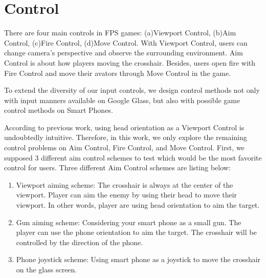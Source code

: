 \documentclass{acm_proc_article-sp}
\begin{document}
\section{Control}
There are four main controls in FPS games: (a)Viewport Control, (b)Aim Control, (c)Fire Control, (d)Move Control.
With Viewport Control, users can change camera's perspective and observe the surrounding environment.
Aim Control is about how players moving the crosshair.
Besides, users open fire with Fire Control and move their avators through Move Control in the game.

To extend the diversity of our input controls, we design control methods not only with input manners available on Google Glass, but also with possible game control methods on Smart Phones.

According to previous work\cite{headvideo,tele,robot,viewport}, using head orientation as a Viewport Control is undoubtedly intuitive.%
Therefore, in this work, we only explore the remaining control problems on Aim Control, Fire Control, and Move Control. 
First, we supposed 3 different aim control schemes to test which would be the most favorite control for users. 
Three different Aim Control schemes are listing below:

\begin{enumerate}
\item Viewport aiming scheme: The crosshair is always at the center of the viewport. Player can aim the enemy by using their head to move their viewport. In other words, player are using head orientation to aim the target.

\item Gun aiming scheme: Considering your smart phone as a small gun. The player can use the phone orientation to aim the target. The crosshair will be controlled by the direction of the phone.

\item Phone joystick scheme: Using smart phone as a joystick to move the crosshair on the glass screen.
\end{enumerate}
\end{document}
